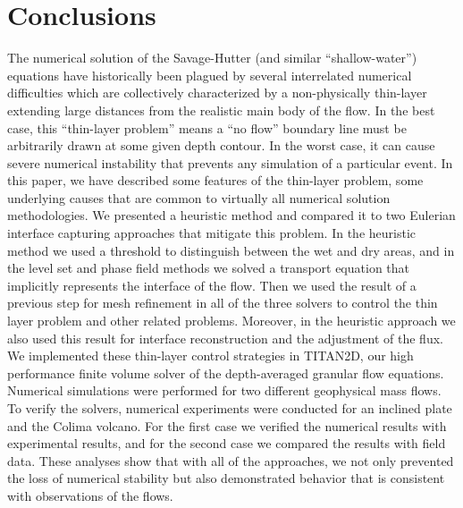 \documentclass[letterpaper,10pt]{article}
\begin{document}
\section{Conclusions} \label{conclusions}
The numerical solution of the Savage-Hutter (and similar 
``shallow-water'') equations have historically been plagued by 
several interrelated numerical difficulties which are collectively characterized by a non-physically thin-layer extending large distances from the realistic main body of the flow. 
In the best case, this ``thin-layer problem'' means a ``no flow'' boundary line must be arbitrarily drawn at some given depth contour.  In 
the worst case, it can cause severe numerical instability that 
prevents any simulation of a particular event.
In this paper, we 
have described some features of the thin-layer problem,
some underlying causes that are common to virtually all numerical 
solution methodologies. We presented a heuristic method and compared it to two Eulerian interface capturing approaches that 
mitigate this problem. In the heuristic method we used a threshold to distinguish between the wet and dry areas, and in the level set and phase field methods we solved a 
transport equation that implicitly represents the interface of the flow. Then we used the result of a previous step for mesh refinement in all of the three solvers to control 
the thin layer problem and other related problems. Moreover, in the heuristic approach we also used this result for interface reconstruction and the adjustment of the flux. 
We implemented these thin-layer control strategies in TITAN2D, our high 
performance finite volume solver of the depth-averaged granular 
flow equations. Numerical simulations were performed for two different geophysical mass flows.
To verify the solvers, numerical experiments were conducted for an inclined plate and the Colima volcano. For the first case we verified the numerical results 
with experimental results, and for the second case we compared the results with field data. These analyses show that with all of the approaches,
we not only prevented the loss of numerical stability but also demonstrated behavior that is consistent with observations of the flows.
%
\end{document}
